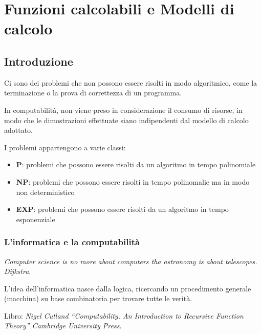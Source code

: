 \chapter{Funzioni calcolabili e Modelli di calcolo}
\section{Introduzione}\label{lezione-1---computabilituxe0-e-algoritmi}

Ci sono dei problemi che non possono essere risolti in modo algoritmico,
come la terminazione o la prova di correttezza di un programma.

In computabilità, non viene preso in considerazione il consumo di
risorse, in modo che le dimostrazioni effettuate siano indipendenti dal
modello di calcolo adottato.

I problemi appartengono a varie classi:

\begin{itemize}
\item
  \textbf{P}: problemi che possono essere risolti da un algoritmo in
  tempo polinomiale
\item
  \textbf{NP}: problemi che possono essere risolti in tempo polinomalie
  ma in modo non deterministico
\item
  \textbf{EXP}: problemi che possono essere risolti da un algoritmo in
  tempo esponenziale
\end{itemize}

\subsection{L'informatica e la
computabilità}\label{linformatica-e-la-computabilituxe0}

\emph{Computer science is no more about computers tha astronomy is about
telescopes. Dijkstra}.

L'idea dell'informatica nasce dalla logica, ricercando un procedimento
generale (macchina) su base combinatoria per trovare tutte le verità.

Libro: \emph{Nigel Cutland ``Computability. An Introduction to Recursive
Function Theory'' Cambridge University Press}.
